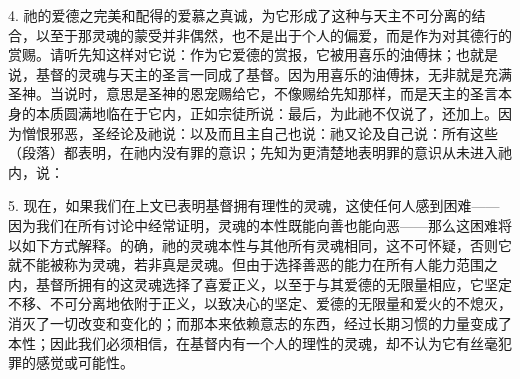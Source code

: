 4. 祂的爱德之完美和配得的爱慕之真诚，为它形成了这种与天主不可分离的结合，以至于那灵魂的蒙受并非偶然，也不是出于个人的偏爱，而是作为对其德行的赏赐。请听先知这样对它说：作为它爱德的赏报，它被用喜乐的油傅抹；也就是说，基督的灵魂与天主的圣言一同成了基督。因为用喜乐的油傅抹，无非就是充满圣神。当说时，意思是圣神的恩宠赐给它，不像赐给先知那样，而是天主的圣言本身的本质圆满地临在于它内，正如宗徒所说：最后，为此祂不仅说了，还加上。因为憎恨邪恶，圣经论及祂说：以及而且主自己也说：祂又论及自己说：所有这些（段落）都表明，在祂内没有罪的意识；先知为更清楚地表明罪的意识从未进入祂内，说：\par

5. 现在，如果我们在上文已表明基督拥有理性的灵魂，这使任何人感到困难——因为我们在所有讨论中经常证明，灵魂的本性既能向善也能向恶——那么这困难将以如下方式解释。的确，祂的灵魂本性与其他所有灵魂相同，这不可怀疑，否则它就不能被称为灵魂，若非真是灵魂。但由于选择善恶的能力在所有人能力范围之内，基督所拥有的这灵魂选择了喜爱正义，以至于与其爱德的无限量相应，它坚定不移、不可分离地依附于正义，以致决心的坚定、爱德的无限量和爱火的不熄灭，消灭了一切改变和变化的；而那本来依赖意志的东西，经过长期习惯的力量变成了本性；因此我们必须相信，在基督内有一个人的理性的灵魂，却不认为它有丝毫犯罪的感觉或可能性。\par

